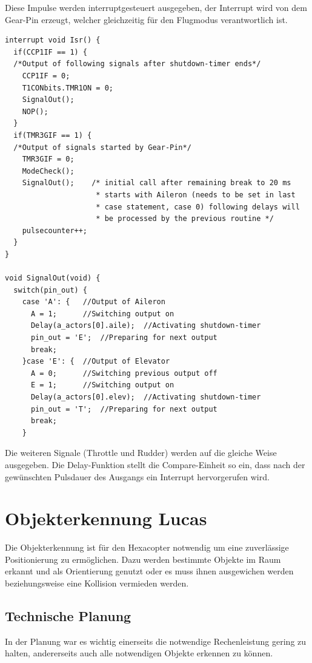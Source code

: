     Diese Impulse werden interruptgesteuert ausgegeben, der Interrupt wird von dem Gear-Pin erzeugt, welcher gleichzeitig für den Flugmodus verantwortlich ist.

    \lstset{language = c}
    \begin{lstlisting}
interrupt void Isr() {
  if(CCP1IF == 1) {
  /*Output of following signals after shutdown-timer ends*/
    CCP1IF = 0;
    T1CONbits.TMR1ON = 0;
    SignalOut();
    NOP();
  }
  if(TMR3GIF == 1) {
  /*Output of signals started by Gear-Pin*/
    TMR3GIF = 0;
    ModeCheck();
    SignalOut();    /* initial call after remaining break to 20 ms
                     * starts with Aileron (needs to be set in last
                     * case statement, case 0) following delays will
                     * be processed by the previous routine */
    pulsecounter++;
  }
}

void SignalOut(void) {
  switch(pin_out) {
    case 'A': {   //Output of Aileron
      A = 1;      //Switching output on
      Delay(a_actors[0].aile);  //Activating shutdown-timer
      pin_out = 'E';  //Preparing for next output
      break;
    }case 'E': {  //Output of Elevator
      A = 0;      //Switching previous output off
      E = 1;      //Switching output on
      Delay(a_actors[0].elev);  //Activating shutdown-timer
      pin_out = 'T';  //Preparing for next output
      break;
    }
    \end{lstlisting}
    Die weiteren Signale (Throttle und Rudder) werden auf die gleiche Weise ausgegeben.
    Die Delay-Funktion stellt die Compare-Einheit so ein, dass nach der gewünschten Pulsdauer des Ausgangs ein Interrupt hervorgerufen wird.

\section{Objekterkennung Lucas}
Die Objekterkennung ist für den Hexacopter notwendig um eine zuverlässige Positionierung zu ermöglichen. Dazu werden bestimmte Objekte im Raum erkannt und als Orientierung
genutzt oder es muss ihnen ausgewichen werden beziehungsweise eine Kollision vermieden werden.

  \subsection{Technische Planung}
  In der Planung war es wichtig einerseits die notwendige Rechenleistung gering zu halten, andererseits auch alle notwendigen Objekte erkennen zu können.

